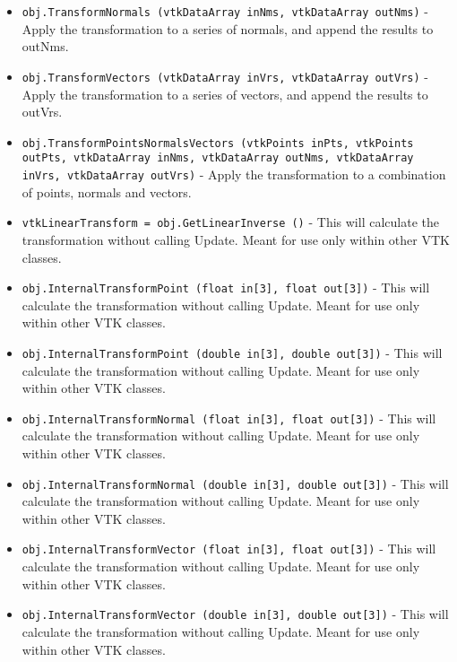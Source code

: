 \begin{itemize}
\item  \verb|obj.TransformNormals (vtkDataArray inNms, vtkDataArray outNms)| -  Apply the transformation to a series of normals, and append the
 results to outNms.  

\item  \verb|obj.TransformVectors (vtkDataArray inVrs, vtkDataArray outVrs)| -  Apply the transformation to a series of vectors, and append the
 results to outVrs.  

\item  \verb|obj.TransformPointsNormalsVectors (vtkPoints inPts, vtkPoints outPts, vtkDataArray inNms, vtkDataArray outNms, vtkDataArray inVrs, vtkDataArray outVrs)| -  Apply the transformation to a combination of points, normals
 and vectors.  

\item  \verb|vtkLinearTransform = obj.GetLinearInverse ()| -  This will calculate the transformation without calling Update.
 Meant for use only within other VTK classes.

\item  \verb|obj.InternalTransformPoint (float in[3], float out[3])| -  This will calculate the transformation without calling Update.
 Meant for use only within other VTK classes.

\item  \verb|obj.InternalTransformPoint (double in[3], double out[3])| -  This will calculate the transformation without calling Update.
 Meant for use only within other VTK classes.

\item  \verb|obj.InternalTransformNormal (float in[3], float out[3])| -  This will calculate the transformation without calling Update.
 Meant for use only within other VTK classes.

\item  \verb|obj.InternalTransformNormal (double in[3], double out[3])| -  This will calculate the transformation without calling Update.
 Meant for use only within other VTK classes.

\item  \verb|obj.InternalTransformVector (float in[3], float out[3])| -  This will calculate the transformation without calling Update.
 Meant for use only within other VTK classes.

\item  \verb|obj.InternalTransformVector (double in[3], double out[3])| -  This will calculate the transformation without calling Update.
 Meant for use only within other VTK classes.

\end{itemize}
